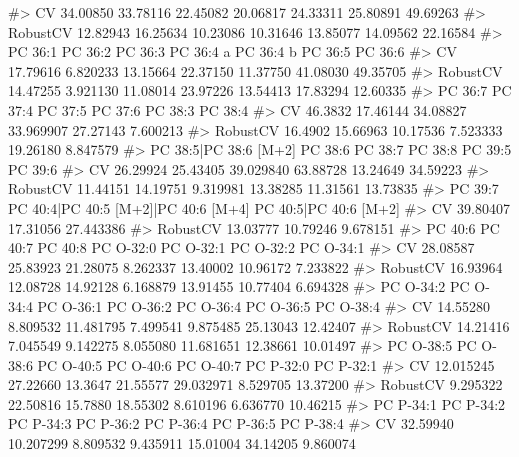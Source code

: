 \documentclass[
  letterpaper,
  DIV=11,
  numbers=noendperiod]{scrreprt}
\newenvironment{Shaded}{\begin{snugshade}}{\end{snugshade}}
\newcommand{\CommentTok}[1]{\textcolor[rgb]{0.37,0.37,0.37}{#1}}
\begin{document}
\begin{Shaded}
\begin{Highlighting}[]
\CommentTok{\#\textgreater{} CV       34.00850 33.78116 22.45082 20.06817 24.33311 25.80891 49.69263}
\CommentTok{\#\textgreater{} RobustCV 12.82943 16.25634 10.23086 10.31646 13.85077 14.09562 22.16584}
\CommentTok{\#\textgreater{}           PC 36:1  PC 36:2  PC 36:3 PC 36:4 a PC 36:4 b  PC 36:5  PC 36:6}
\CommentTok{\#\textgreater{} CV       17.79616 6.820233 13.15664  22.37150  11.37750 41.08030 49.35705}
\CommentTok{\#\textgreater{} RobustCV 14.47255 3.921130 11.08014  23.97226  13.54413 17.83294 12.60335}
\CommentTok{\#\textgreater{}          PC 36:7  PC 37:4  PC 37:5   PC 37:6  PC 38:3  PC 38:4}
\CommentTok{\#\textgreater{} CV       46.3832 17.46144 34.08827 33.969907 27.27143 7.600213}
\CommentTok{\#\textgreater{} RobustCV 16.4902 15.66963 10.17536  7.523333 19.26180 8.847579}
\CommentTok{\#\textgreater{}          PC 38:5|PC 38:6 [M+2]  PC 38:6   PC 38:7  PC 38:8  PC 39:5  PC 39:6}
\CommentTok{\#\textgreater{} CV                    26.29924 25.43405 39.029840 63.88728 13.24649 34.59223}
\CommentTok{\#\textgreater{} RobustCV              11.44151 14.19751  9.319981 13.38285 11.31561 13.73835}
\CommentTok{\#\textgreater{}           PC 39:7 PC 40:4|PC 40:5 [M+2]|PC 40:6 [M+4] PC 40:5|PC 40:6 [M+2]}
\CommentTok{\#\textgreater{} CV       39.80407                            17.31056             27.443386}
\CommentTok{\#\textgreater{} RobustCV 13.03777                            10.79246              9.678151}
\CommentTok{\#\textgreater{}           PC 40:6  PC 40:7  PC 40:8 PC O{-}32:0 PC O{-}32:1 PC O{-}32:2 PC O{-}34:1}
\CommentTok{\#\textgreater{} CV       28.08587 25.83923 21.28075  8.262337  13.40002  10.96172  7.233822}
\CommentTok{\#\textgreater{} RobustCV 16.93964 12.08728 14.92128  6.168879  13.91455  10.77404  6.694328}
\CommentTok{\#\textgreater{}          PC O{-}34:2 PC O{-}34:4 PC O{-}36:1 PC O{-}36:2 PC O{-}36:4 PC O{-}36:5 PC O{-}38:4}
\CommentTok{\#\textgreater{} CV        14.55280  8.809532 11.481795  7.499541  9.875485  25.13043  12.42407}
\CommentTok{\#\textgreater{} RobustCV  14.21416  7.045549  9.142275  8.055080 11.681651  12.38661  10.01497}
\CommentTok{\#\textgreater{}          PC O{-}38:5 PC O{-}38:6 PC O{-}40:5 PC O{-}40:6 PC O{-}40:7 PC P{-}32:0 PC P{-}32:1}
\CommentTok{\#\textgreater{} CV       12.015245  27.22660   13.3647  21.55577 29.032971  8.529705  13.37200}
\CommentTok{\#\textgreater{} RobustCV  9.295322  22.50816   15.7880  18.55302  8.610196  6.636770  10.46215}
\CommentTok{\#\textgreater{}          PC P{-}34:1 PC P{-}34:2 PC P{-}34:3 PC P{-}36:2 PC P{-}36:4 PC P{-}36:5 PC P{-}38:4}
\CommentTok{\#\textgreater{} CV        32.59940 10.207299  8.809532  9.435911  15.01004  34.14205  9.860074}

\end{Highlighting}
\end{Shaded}
\end{document}
